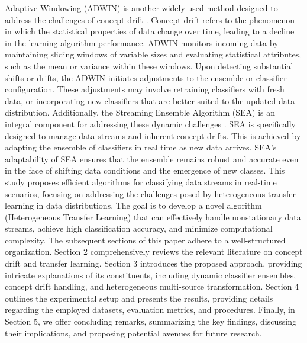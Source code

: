 Adaptive Windowing (ADWIN) is another widely used method designed to address the challenges of concept drift \cite{madkour2023historical}. Concept drift refers to the phenomenon in which the statistical properties of data change over time, leading to a decline in the learning algorithm performance. ADWIN monitors incoming data by maintaining sliding windows of variable sizes and evaluating statistical attributes, such as the mean or variance within these windows. Upon detecting substantial shifts or drifts, the ADWIN initiates adjustments to the ensemble or classifier configuration. These adjustments may involve retraining classifiers with fresh data, or incorporating new classifiers that are better suited to the updated data distribution. Additionally, the Streaming Ensemble Algorithm (SEA) is an integral component for addressing these dynamic challenges \cite{gama2004learning}\cite{adams2023explainable}\cite{madkour2023historical}. SEA is specifically designed to manage data streams and inherent concept drifts. This is achieved by adapting the ensemble of classifiers in real time as new data arrives. SEA's adaptability of SEA ensures that the ensemble remains robust and accurate even in the face of shifting data conditions and the emergence of new classes.
This study proposes efficient algorithms for classifying data streams in real-time scenarios, focusing on addressing the challenges posed by heterogeneous transfer learning in data distributions. The goal is to develop a novel algorithm (Heterogeneous Transfer Learning) that can effectively handle nonstationary data streams, achieve high classification accuracy, and minimize computational complexity. 
The subsequent sections of this paper adhere to a well-structured organization. Section 2 comprehensively reviews the relevant literature on concept drift and transfer learning. Section 3 introduces the proposed approach, providing intricate explanations of its constituents, including dynamic classifier ensembles, concept drift handling, and heterogeneous multi-source transformation. Section 4 outlines the experimental setup and presents the results, providing details regarding the employed datasets, evaluation metrics, and procedures. Finally, in Section 5, we offer concluding remarks, summarizing the key findings, discussing their implications, and proposing potential avenues for future research.
